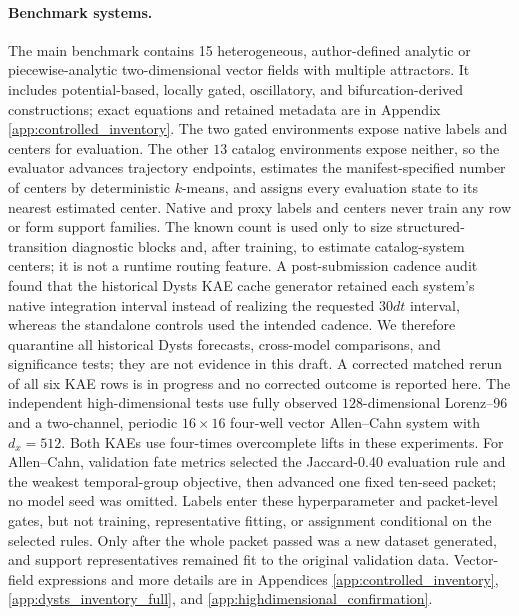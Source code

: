 \documentclass[11pt]{article}
\begin{document}
\paragraph{Benchmark systems.} The main benchmark contains 15 heterogeneous, author-defined analytic or piecewise-analytic two-dimensional vector fields with multiple attractors. It includes potential-based, locally gated, oscillatory, and bifurcation-derived constructions; exact equations and retained metadata are in Appendix \ref{app:controlled_inventory}. The two gated environments expose native labels and centers for evaluation. The other \(13\) catalog environments expose neither, so the evaluator advances trajectory endpoints, estimates the manifest-specified number of centers by deterministic \(k\)-means, and assigns every evaluation state to its nearest estimated center. Native and proxy labels and centers never train any row or form support families. The known count is used only to size structured-transition diagnostic blocks and, after training, to estimate catalog-system centers; it is not a runtime routing feature. A post-submission cadence audit found that the historical Dysts KAE cache generator retained each system's native integration interval instead of realizing the requested \(30dt\) interval, whereas the standalone controls used the intended cadence. We therefore quarantine all historical Dysts forecasts, cross-model comparisons, and significance tests; they are not evidence in this draft. A corrected matched rerun of all six KAE rows is in progress and no corrected outcome is reported here.
The independent high-dimensional tests use fully observed \(128\)-dimensional Lorenz--96 and a two-channel, periodic \(16\times16\) four-well vector Allen--Cahn system with \(d_x=512\). Both KAEs use four-times overcomplete lifts in these experiments. For Allen--Cahn, validation fate metrics selected the Jaccard-0.40 evaluation rule and the weakest temporal-group objective, then advanced one fixed ten-seed packet; no model seed was omitted. Labels enter these hyperparameter and packet-level gates, but not training, representative fitting, or assignment conditional on the selected rules. Only after the whole packet passed was a new dataset generated, and support representatives remained fit to the original validation data. Vector-field expressions and more details are in Appendices \ref{app:controlled_inventory}, \ref{app:dysts_inventory_full}, and \ref{app:highdimensional_confirmation}.
\end{document}
